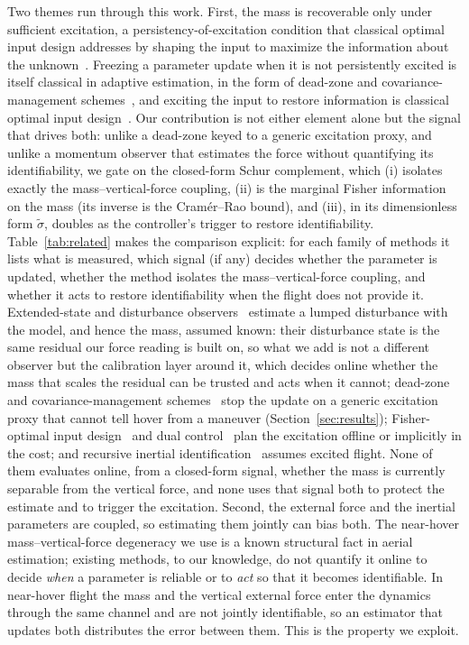 \documentclass{ieeeaccess}
\begin{document}
Two themes run through this work. First, the mass is recoverable only under
sufficient excitation, a persistency-of-excitation condition that classical
optimal input design addresses by shaping the input to maximize the information
about the unknown~\cite{mehra1974optimal}. Freezing a parameter update when it is
not persistently excited is itself classical in adaptive estimation, in the form
of dead-zone and covariance-management schemes~\cite{ioannou1996robust,narendra1987persistent}, and
exciting the input to restore information is classical optimal input
design~\cite{mehra1974optimal}. Our contribution is not either element alone
but the signal that drives both: unlike a dead-zone keyed to a generic
excitation proxy, and unlike a momentum observer that estimates the force without
quantifying its identifiability, we gate on the closed-form Schur complement, which
(i) isolates exactly the mass--vertical-force coupling, (ii) is the marginal Fisher
information on the mass (its inverse is the Cram\'er--Rao bound), and (iii), in its
dimensionless form $\tilde\sigma$, doubles as the
controller's trigger to restore identifiability.
Table~\ref{tab:related} makes the comparison explicit: for each family of
methods it lists what is measured, which signal (if any) decides whether the
parameter is updated, whether the method isolates the mass--vertical-force
coupling, and whether it acts to restore identifiability when the flight does not
provide it. Extended-state and disturbance observers~\cite{han2009pid,chen2016disturbance}
estimate a lumped disturbance with the model, and hence the mass, assumed
known: their disturbance state is the same residual our force reading is built
on, so what we add is not a different observer but the calibration layer around
it, which decides online whether the mass that scales the residual can be
trusted and acts when it cannot; dead-zone and covariance-management schemes~\cite{ioannou1996robust,narendra1987persistent}
stop the update on a generic excitation proxy that cannot tell hover from a
maneuver (Section~\ref{sec:results}); Fisher-optimal input
design~\cite{mehra1974optimal,morelli2022inertia} and dual
control~\cite{mesbah2018dual} plan the excitation offline or implicitly in the
cost; and recursive inertial identification~\cite{wuest2019online,burri2018system,boyacioglu2023inertial}
assumes excited flight. None of them evaluates online, from a closed-form
signal, whether the mass is currently separable from the vertical force, and
none uses that signal both to protect the estimate and to trigger the excitation.
Second, the external force and the inertial parameters are coupled, so estimating
them jointly can bias both. The near-hover mass--vertical-force degeneracy we use
is a known structural fact in aerial estimation; existing methods, to our
knowledge, do not quantify it online to decide \emph{when} a parameter is
reliable or to \emph{act} so that it becomes identifiable. In near-hover flight
the mass and the vertical external force enter the dynamics through the same
channel and are not jointly identifiable, so an estimator that updates both
distributes the error between them. This is the property we exploit.
\end{document}

